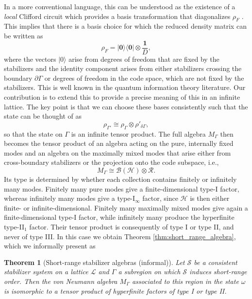 \documentclass[aps,pra,reprint,superscriptaddress]{revtex4-2}
\newcommand{\cB}{{\mathcal B}}
\newcommand{\cH}{{\mathcal H}}
\newcommand{\cL}{{\mathcal L}}
\newcommand{\cR}{{\mathcal R}}
\newcommand{\cS}{{\mathcal S}}
\renewcommand\d{\delta}
\newcommand\G{\Gamma}
\renewcommand\r{\rho}
\newcommand\w{\omega}
\newcommand{\id}{\mathbf 1}
\providecommand{\ket}[1]{\lvert #1\rangle}
\providecommand{\bra}[1]{\langle #1\rvert}
\newtheorem{theorem}{Theorem}
\theoremstyle{definition}
\theoremstyle{remark}
\begin{document}
In a more conventional language, this can be understood as the existence of a \emph{local} Clifford circuit which provides a basis transformation that diagonalizes $\r_F$ \cite{NielsenChuang2010}.
This implies that there is a basis choice for which the reduced density matrix can be written as
\begin{equation}
    \rho_{F} =
 \ket{\mathbf 0}\!\bra{\mathbf 0}
 \otimes\frac{\id}{D},
\end{equation}
where the vectors $\ket{0}$ arise from degrees of freedom that are fixed by the stabilizers and the identity component arises from either stabilizers crossing the boundary $\partial\G$ or degrees of freedom in the code space, which are not fixed by the stabilizers. This is well known in the quantum information theory literature. Our contribution is to extend this to provide a precise meaning of this in an infinite lattice.
The key point is that we can choose these bases consistently such that the state can be thought of as
\begin{equation}\label{eq:growing_state}
    \r_{\G'} \cong \r_\G \otimes \r'_{\d \G},
\end{equation}
so that the state on $\G$ is an infinite tensor product.
The full algebra $M_\G$ then becomes the tensor product of an algebra acting on
the pure, internally fixed modes and an algebra on the maximally mixed modes
that arise either from cross-boundary stabilizers or the projection onto the
code subspace, i.e.,
\begin{equation}
    M_\G \cong \cB(\cH) \otimes \cR.
\end{equation}
Its type is determined by whether each collection contains finitely or
infinitely many modes.  Finitely many pure modes give a finite-dimensional type-I factor,
whereas infinitely many modes give a type-I$_\infty$ factor, since $\cH$ is then
either finite- or infinite-dimensional.  Finitely many maximally
mixed modes give again a finite-dimensional type-I factor, while infinitely many produce the hyperfinite
type-II$_1$ factor. Their tensor product is consequently of type I or type II,
and never of type III. 
In this case we obtain Theorem \ref{thm:short_range_algebra}, which we informally present as
\begin{theorem}[Short-range stabilizer algebras (informal)]\label{thm:type_for_short_range_entanglement}
    Let $\cS$ be a consistent stabilizer system on a lattice $\cL$ and $\G$ a subregion on which $\cS$ induces short-range order. Then the von Neumann algebra $M_\G$ associated to this region in the state $\w$ is isomorphic to a tensor product of hyperfinite factors of type I or type II.
\end{theorem}
\end{document}
